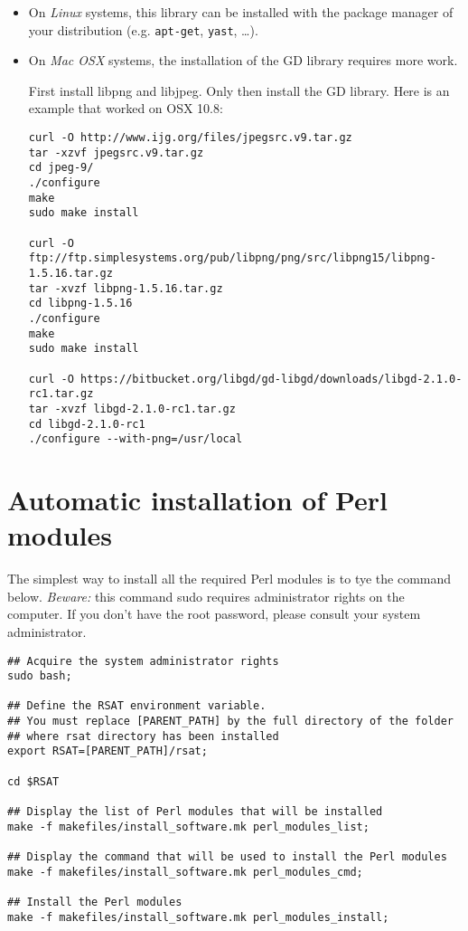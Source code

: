 \documentclass[12pt,a4paper, oneside]{scrreprt} %
\begin{document}
\begin{itemize}

\item On \emph{Linux} systems, this library can be installed with the
  package manager of your distribution (e.g. \texttt{apt-get},
  \texttt{yast}, \ldots).

\item On \emph{Mac OSX} systems, the installation of the GD library requires more work.

First install libpng and libjpeg. Only then install the GD library. Here is an example that worked on OSX 10.8:
\begin{lstlisting}
curl -O http://www.ijg.org/files/jpegsrc.v9.tar.gz
tar -xzvf jpegsrc.v9.tar.gz 
cd jpeg-9/
./configure
make
sudo make install

curl -O ftp://ftp.simplesystems.org/pub/libpng/png/src/libpng15/libpng-1.5.16.tar.gz
tar -xvzf libpng-1.5.16.tar.gz 
cd libpng-1.5.16
./configure
make
sudo make install

curl -O https://bitbucket.org/libgd/gd-libgd/downloads/libgd-2.1.0-rc1.tar.gz
tar -xvzf libgd-2.1.0-rc1.tar.gz
cd libgd-2.1.0-rc1
./configure --with-png=/usr/local
\end{lstlisting}

\end{itemize}

\section{Automatic installation of Perl modules}

The simplest way to install all the required Perl modules is to tye
the command below. \emph{Beware:} this command sudo requires
administrator rights on the computer. If you don't have the root
password, please consult your system administrator.

\begin{lstlisting}
## Acquire the system administrator rights
sudo bash;

## Define the RSAT environment variable.
## You must replace [PARENT_PATH] by the full directory of the folder
## where rsat directory has been installed
export RSAT=[PARENT_PATH]/rsat;

cd $RSAT

## Display the list of Perl modules that will be installed
make -f makefiles/install_software.mk perl_modules_list;

## Display the command that will be used to install the Perl modules
make -f makefiles/install_software.mk perl_modules_cmd;

## Install the Perl modules
make -f makefiles/install_software.mk perl_modules_install;
\end{lstlisting}
\end{document}

